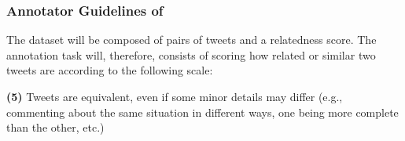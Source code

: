 \begin{table}[ht]
\caption{Topics present in {\TweetTopic}.}
\label{appendix:SuperTweetEval-topics_list}
\end{table}


\begin{table}[ht]
\caption{Classes present in {\TweetHate}.}
\label{appendix:SuperTweetEval-hate_list}
\end{table}


\subsubsection{Annotator Guidelines of {\TweetSimilarity}}
\label{appendix:SuperTweetEval-annotation}

The dataset will be composed of pairs of tweets and a relatedness score. The annotation task will, therefore, consists of scoring how related or similar two tweets are according to the following scale:

\noindent \textbf{(5)} Tweets are equivalent, even if some minor details may differ (e.g., commenting about the same situation in different ways, one being more complete than the other, etc.)

